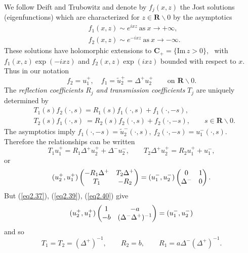 \documentclass{surv-l}
\theoremstyle{plain}
\theoremstyle{definition}
\numberwithin{equation}{chapter}
\begin{document}
We follow Deift and Trubowitz and denote by $f_{j}(x,z)$ the Jost solutions (eigenfunctions) which are characterized for $z\in \mathbf{R}\backslash 0$ by the asymptotics
\begin{align*}
&f_{1}(x, z)\sim e^{ixz}\ \mathrm{as}\  x\rightarrow+\infty,\\
&f_{2}(x, z) \sim e^{-ixz}\ \mathrm{as}\  x\rightarrow-\infty.
\end{align*}
These solutions have holomorphic extensions to $\mathbf{C}_{+} = \{\mathrm{Im}\, z>0\}$, \, with $f_{1}(x, z) \exp(-ixz)$ and $f_{2}(x, z) \exp(ixz)$ bounded with respect to $x$. Thus in our notation
\begin{equation*}
f_{2}=u_{1}^{+},\quad f_{1}=\tilde{u}_{2}^{+}=\Delta^{+}u_{2}^{+}\qquad \mathrm{on}\,\ \mathbf{R}\backslash 0.
\end{equation*}
The \emph{reflection coefficients $R_{j}$ \emph{and} transmission coefficients} $T_{j}$ are uniquely determined by
\begin{align*}
&T_{1}(s)f_{2}(\cdot, s)=R_{1}(s)f_{1}(\cdot, s)+f_{1}(\cdot, -s),\\
&T_{2}(s)f_{1}(\cdot, s)\ =R_{2}(s)f_{2}(\cdot, s)+f_{2}(\cdot, -s),\qquad s\in \mathbf{R}\backslash 0.
\end{align*}
The asymptotics imply $f_{1}(\cdot, -s)=\tilde{u}_{2}^{-}(\cdot, s),\ f_{2}(\cdot, -s)=u_{1}^{-}(\cdot, s)$. Therefore the relationships can be written
\begin{equation*}
T_{1}u_{1}^{+}=R_{1}\Delta^{+}u_{2}^{+}+\Delta^{-}u_{2}^{-},\qquad T_{2}\Delta^{+}u_{2}^{+}=R_{2}u_{1}^{+}+u_{1}^{-},
\end{equation*}
or
\begin{equation*}
(u_{2}^{+}, u_{1}^{+}) \left(\begin{array}{@{}cc@{}}
-R_{1}\Delta^{+} & T_{2}\Delta^{+}\\
T_{1} & -R_{2}
\end{array}\right)=(u_{1}^{-},u_{2}^{-}) \left(\begin{array}{@{}cc@{}}
0 & 1\\
\Delta^{-} & 0
\end{array}\right).
\end{equation*}
But (\ref{eq2.37}), (\ref{eq2.39}), (\ref{eq2.40}) give
 \begin{equation*}
(u_{2}^{+}, u_{1}^{+}) \left(\begin{array}{@{}cc@{}}
1 & -a\\
-b & (\Delta^{-}\Delta^{+})^{-1}
\end{array}\right)=(u_{1}^{-},u_{2}^{-})
\end{equation*}
and so
\begin{equation*}
T_{1}=T_{2}=(\Delta^{+})^{-1},\qquad R_{2}=b,\qquad R_{1}=a\Delta^{-}(\Delta^{+})^{-1}.
\end{equation*}
\end{document}
